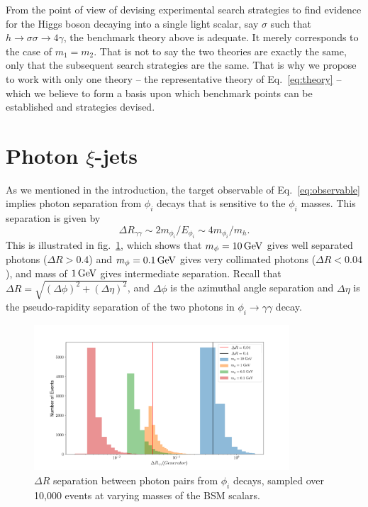 \documentclass[letter,12pt]{article}
\def\gev{\, {\rm GeV}}
\begin{document}
From the point of view of devising experimental search strategies to find evidence for the Higgs boson decaying into a single light scalar, say $\sigma$ such that $h\to \sigma\sigma\to 4\gamma$, the benchmark theory above is adequate. It merely corresponds to the case of $m_1=m_2$. That is not to say the two theories are exactly the same, only that the subsequent search strategies are the same. That is why we propose to work with only one theory -- the representative theory of Eq.~\ref{eq:theory} -- which we believe to form a basis upon which benchmark points can be established and strategies devised.

\section{Photon $\xi$-jets}

As we mentioned in the introduction, the target observable of Eq.~\ref{eq:observable} implies photon separation from $\phi_i$ decays that is sensitive to the $\phi_i$ masses. This separation is given by
\begin{equation}
\Delta R_{\gamma\gamma} \sim 2 m_{\phi_{i}}/ E_{\phi_{i}} \sim 4 m_{\phi_{i}} / m_h.
\end{equation}
This is illustrated in fig.~\ref{fig:DeltaRs}, which shows that $m_\phi=10\gev$ gives well separated photons ($\Delta R>0.4$) and $m_\phi=0.1\gev$ gives very collimated photons ($\Delta R<0.04$), and mass of $1\gev$ gives intermediate separation. Recall that $\Delta R=\sqrt{(\Delta \phi)^2+(\Delta\eta)^2}$, and $\Delta\phi$ is the azimuthal angle separation and $\Delta\eta$ is the pseudo-rapidity separation of the two photons in $\phi_i\to\gamma\gamma$ decay.

\begin{figure}[t] 
\begin{center}
\includegraphics[width=0.85\textwidth]{deltaRs.png} 
\caption{$\Delta R$ separation between photon pairs from $\phi_{i}$ decays, sampled over 10,000 events at varying masses of the BSM scalars.}
\label{fig:DeltaRs}
\end{center}
\end{figure}
\end{document}

